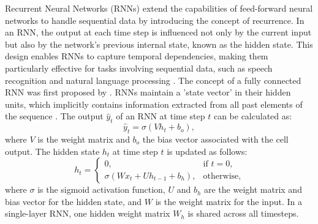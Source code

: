 \documentclass[12pt, a4paper, headinclude, twoside, plainheadsepline, open=right, numbers=noenddot, hidelinks, toc=listof, toc=bibliography]{scrreprt}
\begin{document}
Recurrent Neural Networks (RNNs) extend the capabilities of feed-forward neural networks to handle sequential data by introducing the concept of recurrence. In an RNN, the output at each time step is influenced not only by the current input but also by the network's previous internal state, known as the hidden state. This design enables RNNs to capture temporal dependencies, making them particularly effective for tasks involving sequential data, such as speech recognition and natural language processing \cite{lecunDeepLearning2015}.
%
%
%
%
%
%
The concept of a fully connected RNN was first proposed by \citeauthor{elmanFindingStructureTime1990} \cite{elmanFindingStructureTime1990}. 
RNNs maintain a 'state vector' in their hidden units, which implicitly contains information extracted from all past elements of the sequence \cite{lecunDeepLearning2015}. The output \( \hat{y}_t \) of an RNN at time step \( t \) can be calculated as:
\begin{equation}
\label{eq:rnn_output}
\hat{y}_t = \sigma(V h_t + b_o),
\end{equation}
where \( V \) is the weight matrix and \( b_o \) the bias vector associated with the cell output. 
The hidden state \( h_t \) at time step \( t \) is updated as follows:
\begin{equation}
\label{eq:rnn_update} 
h_t =
\begin{cases}
	0, & \text{if } t = 0, \\
	\sigma (W x_t + U h_{t-1} + b_h), & \text{otherwise},
\end{cases}
\end{equation}
where \( \sigma \) is the sigmoid activation function, \( U \) and \( b_h \) are the weight matrix and bias vector for the hidden state, and \( W \) is the weight matrix for the input. In a single-layer RNN, one hidden weight matrix \( W_h \) is shared across all timesteps.
\end{document}
